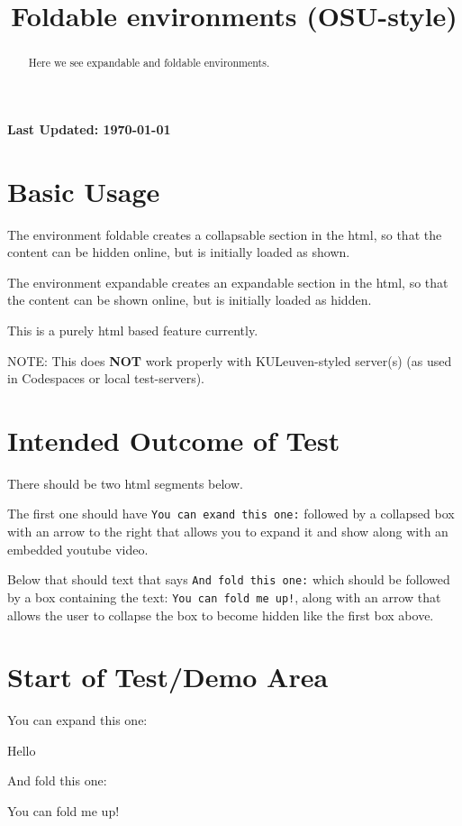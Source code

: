 \documentclass{ximera}
\title{Foldable environments (OSU-style)}
\begin{document}
\begin{abstract}
  Here we see expandable and foldable environments.
\end{abstract}
\maketitle

{{\Huge \bfseries Last Updated: \today}} \\

\section{Basic Usage}
The environment foldable creates a collapsable section in the html, so that the content can be hidden online, but is initially loaded as shown.

The environment expandable creates an expandable section in the html, so that the content can be shown online, but is initially loaded as hidden.

This is a purely html based feature currently.

NOTE: This does \textbf{NOT} work properly with KULeuven-styled server(s) (as used in Codespaces or local test-servers).


\section{Intended Outcome of Test}

There should be two html segments below. 

The first one should have \texttt{You can exand this one:} followed by 
a collapsed box with an arrow to the right that allows you to expand it and show  along with an embedded youtube video.

Below that should text that says \texttt{And fold this one:} which should be followed by a box containing the text:
\texttt{You can fold me up!}, along with an arrow that allows the user to collapse the box to become hidden like the 
first box above.


\section{Start of Test/Demo Area}

You can expand this one:

\begin{expandable}
  Hello
 \begin{center}
 \end{center}
\end{expandable}



And fold this one:

\begin{foldable}
  You can fold me up!
\end{foldable}


\hrulefill
\end{document}
